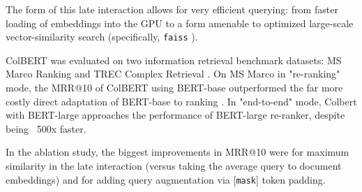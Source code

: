 \documentclass[11pt]{article}
\begin{document}
The form of this late interaction allows for very efficient querying: from faster loading of embeddings into the GPU to a form amenable to optimized large-scale vector-similarity search (specifically, \texttt{faiss} \cite{faiss}).

ColBERT was evaluated on two information retrieval benchmark datasets: MS Marco Ranking \cite{MSMarco} and TREC Complex Retrieval \cite{TREC-CAR}. On MS Marco in "re-ranking" mode, the MRR@10 of ColBERT using BERT-base outperformed the far more costly direct adaptation of BERT-base to ranking \cite{Nogueira2019}. In "end-to-end" mode, Colbert with BERT-large approaches the performance of BERT-large re-ranker, despite being ~500x faster. 

In the ablation study, the biggest improvements in MRR@10 were for maximum similarity in the late interaction (versus taking the average query to document embeddings) and for adding query augmentation via [\texttt{mask}] token padding. 




\end{document}

